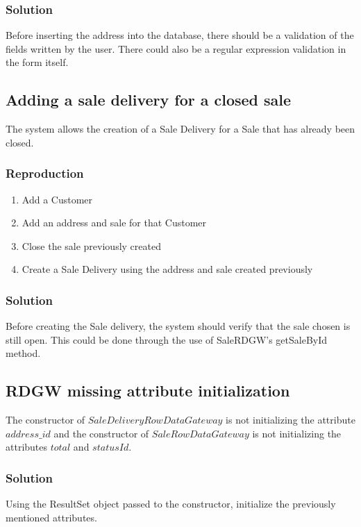 \documentclass[12pt]{article}
\begin{document}
\subsubsection{Solution}
Before inserting the address into the database, there should be a validation of the fields written by the user. There could also be a regular expression validation in the form itself.
\newpage
\subsection{Adding a sale delivery for a closed sale}
The system allows the creation of a Sale Delivery for a Sale that has already been closed.

\subsubsection{Reproduction}
\begin{enumerate}
   \item  Add a Customer
   
   \item  Add an address and sale for that Customer
   
   \item  Close the sale previously created
   
   \item  Create a Sale Delivery using the address and sale created previously
\end{enumerate}


\subsubsection{Solution}
Before creating the Sale delivery, the system should verify that the sale chosen is still open. This could be done through the use of SaleRDGW's getSaleById method.

\subsection{RDGW missing attribute initialization}
The constructor of $SaleDeliveryRowDataGateway$ is not initializing the attribute $address\_id$ and the constructor of $SaleRowDataGateway$ is not initializing the attributes $total$ and $statusId$. 


\subsubsection{Solution}
Using the ResultSet object passed to the constructor, initialize the previously mentioned attributes.
\newpage
\end{document}
